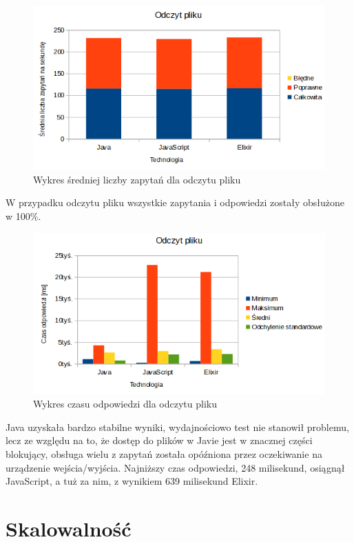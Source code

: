 \documentclass[12pt,twoside]{article}
\begin{document}
\begin{figure}[!ht]
\centering
\includegraphics[resolution=120]{test_results/summary/file_avg.png}
\caption{Wykres średniej liczby zapytań dla odczytu pliku}
\end{figure}

W przypadku odczytu pliku wszystkie zapytania i odpowiedzi zostały
obsłużone w 100\%.

\begin{figure}[!ht]
\centering
\includegraphics[resolution=120]{test_results/summary/file_response.png}
\caption{Wykres czasu odpowiedzi dla odczytu pliku}
\end{figure}

Java uzyskała bardzo stabilne wyniki, wydajnościowo test nie stanowił
problemu, lecz ze względu na to, że dostęp do plików w Javie jest w
znacznej części blokujący, obsługa wielu z zapytań została opóźniona
przez oczekiwanie na urządzenie wejścia/wyjścia. Najniższy czas
odpowiedzi, 248 milisekund, osiągnął JavaScript, a tuż za nim, z
wynikiem 639 milisekund Elixir.

\clearpage
\clearpage{}
	\clearpage{}\section{Skalowalność}\label{skalowalnoux15bux107}
\end{document}
